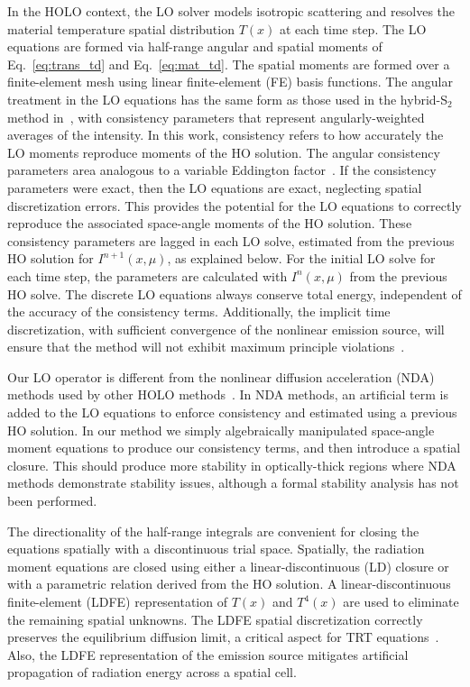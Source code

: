 In the HOLO context, the LO solver models isotropic scattering and
resolves the material temperature spatial distribution $T(x)$ at each time step.  The LO equations are formed via half-range 
angular and spatial moments of
Eq.~\eqref{eq:trans_td} and Eq.~\eqref{eq:mat_td}. 
The spatial moments are formed over a
finite-element mesh using linear finite-element (FE) basis functions.   The angular treatment in the LO equations has the same form as those
used in the hybrid-S$_2$ method in~\cite{wolters},  with consistency parameters that
represent angularly-weighted averages of the intensity.  In this work, consistency refers
to how accurately the LO moments reproduce moments of the HO solution.
The angular consistency parameters
area analogous to a variable Eddington factor~\cite{chandrasekhar}.  If the consistency parameters were exact, then the LO
equations are exact, neglecting spatial discretization errors.  This provides the
potential for the LO equations to correctly reproduce the associated space-angle
moments of the HO solution. These consistency
parameters are lagged in each LO solve, estimated from the previous HO solution for
$I^{n+1}(x,\mu)$, as explained below. For the initial LO solve for each time step, the
parameters are calculated with $I^{n}(x,\mu)$ from the previous HO solve.  The discrete LO equations always conserve
total energy, independent of the accuracy of the consistency terms. 
Additionally, the
implicit time discretization, with sufficient convergence of the nonlinear emission
source, will ensure that the method will not exhibit maximum principle
violations~\cite{larsen_mpv}.

Our LO operator is different from the nonlinear
diffusion acceleration (NDA) methods used by other HOLO methods~\cite{rmc,park,willert}.  In
NDA methods, an artificial term is added to the LO equations to enforce consistency and estimated using a
previous HO solution.  In our method we simply algebraically 
manipulated space-angle moment equations to produce our consistency terms, and then
introduce a spatial closure. This should produce more
stability in optically-thick regions where NDA methods demonstrate stability issues,
although a formal stability analysis has not been performed.

The directionality of the half-range integrals are convenient for closing the equations
spatially with a discontinuous trial space.  Spatially, the radiation moment
equations are closed using either a linear-discontinuous (LD) closure or with a
parametric relation derived from the HO solution.  A linear-discontinuous
finite-element (LDFE) representation of $T(x)$
and $T^4(x)$ are used to eliminate the remaining spatial unknowns.
The LDFE spatial discretization correctly preserves the equilibrium diffusion limit, a
critical aspect for TRT equations~\cite{larsen_edl,morel_newton}. Also, the LDFE
representation of the emission source mitigates artificial propagation of radiation
energy across a spatial cell.

